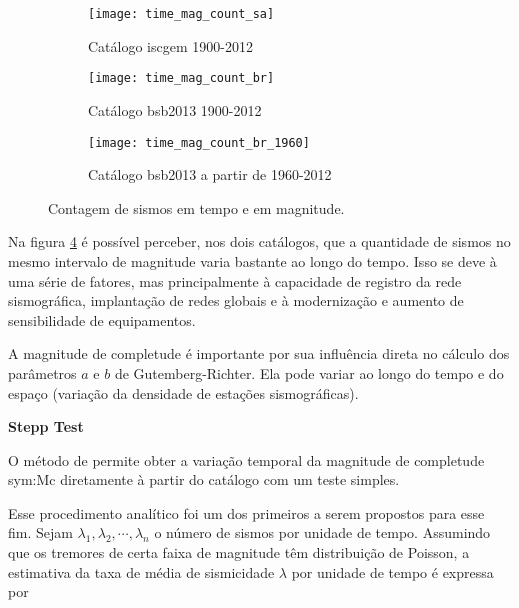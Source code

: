 \begin{figure}[H]
	  \centering
	  \begin{subfigure}[b]{0.7\textwidth}
		  	\centering
			\texttt{[image: time\_mag\_count\_sa]}
			\caption{Catálogo \gls{iscgem} 1900-2012}
			\label{fig:tmf_sa}
        \end{subfigure}%

	  \begin{subfigure}[b]{0.7\textwidth}
		  	\centering
  			\texttt{[image: time\_mag\_count\_br]}
			\caption{Catálogo \gls{bsb2013} 1900-2012}
			\label{fig:tmf_br}
       \end{subfigure}%

	   \begin{subfigure}[b]{0.7\textwidth}
		  	\centering
  			\texttt{[image: time\_mag\_count\_br\_1960]}
			\caption{Catálogo \gls{bsb2013} a partir de 1960-2012}
			\label{fig:tmf_br_1960}
       \end{subfigure}%

  \caption{Contagem de sismos em tempo e em magnitude.}
  \label{fig:qc_time_mag_count} 
\end{figure}

Na figura \ref{fig:qc_time_mag_count} é possível perceber, nos dois catálogos,
que a quantidade de sismos no mesmo intervalo de magnitude varia bastante ao longo do tempo.
Isso se deve à uma série de fatores, mas principalmente à capacidade de registro
da rede sismográfica, implantação de redes globais e 
à modernização e aumento de sensibilidade de equipamentos.

A magnitude de completude é importante \citep{woessner_2005} por sua influência direta no cálculo dos parâmetros $a$ e
$b$ de Gutemberg-Richter.
Ela pode variar ao longo do tempo e do espaço (variação da densidade de estações sismográficas).


\begin{p}
\textbf{Stepp Test}
\end{p}

O método de \citet{stepp_1971} permite obter a variação temporal da magnitude
de completude \gls{sym:Mc} diretamente à partir do catálogo com um teste simples.

Esse procedimento analítico foi um dos primeiros a serem propostos para esse fim.
Sejam $\lambda_1, \lambda_2, \cdots, \lambda_n$ o número de sismos por unidade de tempo.
Assumindo que os tremores de certa faixa de magnitude têm distribuição de Poisson, a estimativa da taxa de
média de sismicidade $\lambda$ por unidade de tempo é expressa por

